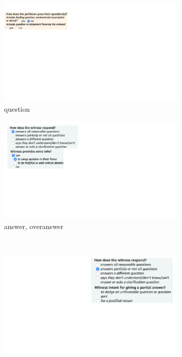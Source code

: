 \begin{figure}
\centering
\begin{subfigure}{.45\textwidth}
  \centering
  \includegraphics[width=1\linewidth]{plots/subj_amt_screenshots_question.pdf}
  \vspace{3.5em}
  \caption{question}
\end{subfigure}%
\begin{subfigure}{.45\textwidth}
  \centering
  \includegraphics[width=1\linewidth]{plots/subj_amt_screenshots_overanswer.pdf}
  \caption{answer, overanswer}
\end{subfigure}\\
\begin{subfigure}{.34\textwidth}
  \centering
  \includegraphics[width=1\linewidth]{plots/subj_amt_screenshots_response2.pdf}

\end{subfigure}
\end{figure}
